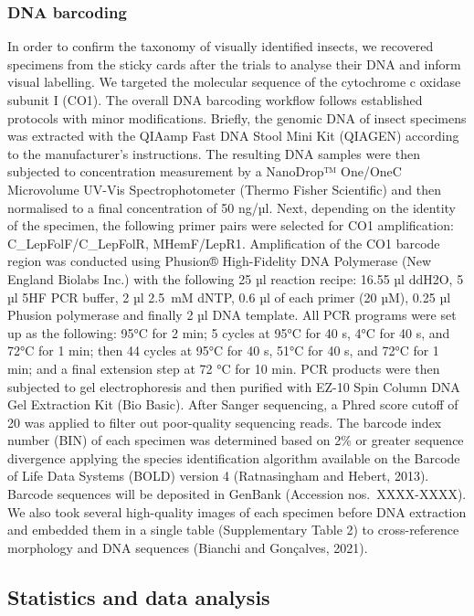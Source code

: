 \documentclass[12pt]{article}
\begin{document}
\begin{linenumbers}
		\subsubsection*{DNA barcoding}
		In order to confirm the taxonomy of visually identified insects, we recovered specimens from the sticky cards after the trials to analyse their DNA and inform visual labelling. We targeted the molecular sequence of the cytochrome c oxidase subunit I (CO1). The overall DNA barcoding workflow follows established protocols\cite{dewaard_expedited_2018} with minor modifications. Briefly, the genomic DNA of insect specimens was extracted with the QIAamp Fast DNA Stool Mini Kit (QIAGEN) according to the manufacturer’s instructions. The resulting DNA samples were then subjected to concentration measurement by a NanoDrop™ One/OneC Microvolume UV-Vis Spectrophotometer (Thermo Fisher Scientific) and then normalised to a final concentration of 50 ng/µl. Next, depending on the identity of the specimen, the following primer pairs were selected for CO1 amplification: C\_LepFolF/C\_LepFolR\cite{hernandeztriana_recovery_2014}, MHemF/LepR1\cite{park_barcoding_2011}. Amplification of the CO1 barcode region was conducted using Phusion® High-Fidelity DNA Polymerase (New England Biolabs Inc.) with the following 25 µl reaction recipe: 16.55 µl ddH2O, 5 µl 5HF PCR buffer, 2 µl 2.5~mM dNTP, 0.6 µl of each primer (20 µM), 0.25 µl Phusion polymerase and finally 2 µl DNA template. All PCR programs were set up as the following: 95°C for 2 min; 5 cycles at 95°C for 40 s, 4°C for 40 s, and 72°C for 1 min; then 44 cycles at 95°C for 40 s, 51°C for 40 s, and 72°C for 1 min; and a final extension step at 72 °C for 10 min. PCR products were then subjected to gel electrophoresis and then purified with EZ-10 Spin Column DNA Gel Extraction Kit (Bio Basic). After Sanger sequencing, a Phred score cutoff of 20 was applied to filter out poor-quality sequencing reads. 
		The barcode index number (BIN) of each specimen was determined based on 2\% or greater sequence divergence applying the species identification algorithm available on the Barcode of Life Data Systems (BOLD) version 4 (Ratnasingham and Hebert, 2013). Barcode sequences will be deposited in GenBank (Accession nos.~XXXX-XXXX). We also took several high-quality images of each specimen before DNA extraction and embedded them in a single table (Supplementary Table 2) to cross-reference morphology and DNA sequences (Bianchi and Gonçalves, 2021).

		
		\subsection*{Statistics and data analysis}


\end{linenumbers}
\end{document}
